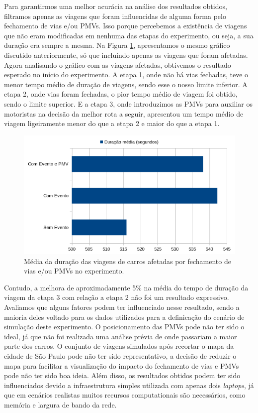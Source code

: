 Para garantirmos uma melhor acurácia na análise dos resultados obtidos, filtramos apenas as viagens que foram influencidas de alguma forma pelo fechamento de vias e/ou PMVs.
Isso porque percebemos a existência de viagens que não eram modificadas em nenhuma das etapas do experimento, ou seja, a sua duração era sempre a mesma.
Na Figura \ref{fig:duracao_filtered}, apresentamos o mesmo gráfico discutido anteriormente, só que incluindo apenas as viagens que foram afetadas.
Agora analisando o gráfico com as viagens afetadas, obtivemos o resultado esperado no início do experimento.
A etapa 1, onde não há vias fechadas, teve o menor tempo médio de duração de viagens, sendo esse o nosso limite inferior.
A etapa 2, onde vias foram fechadas, o pior tempo médio de viagem foi obtido, sendo o limite superior.
E a etapa 3, onde introduzimos as PMVs para auxiliar os motoristas na decisão da melhor rota a seguir, apresentou um tempo médio de viagem ligeiramente menor do que a etapa 2 e maior do que a etapa 1.

\begin{figure}[ht]
	\centering
	\includegraphics[width=\textwidth]{figuras/duracao_filtered.png}
	\caption{Média da duração das viagens de carros afetadas por fechamento de vias e/ou PMVs no experimento.}
	\label{fig:duracao_filtered}
\end{figure}

Contudo, a melhora de aproximadamente 5\% na média do tempo de duração da viagem da etapa 3 com relação a etapa 2 não foi um resultado expressivo.
Avaliamos que alguns fatores podem ter influenciado nesse resultado, sendo a maioria deles voltado para os dados utilizados para a definicação do cenário de simulação deste experimento.
O posicionamento das PMVs pode não ter sido o ideal, já que não foi realizada uma análise prévia de onde passariam a maior parte dos carros.
O conjunto de viagens simulados após recortar o mapa da cidade de São Paulo pode não ter sido representativo, a decisão de reduzir o mapa para facilitar a visualização do impacto do fechamento de vias
e PMVs pode não ter sido boa ideia.
Além disso, os resultados obtidos podem ter sido influenciados devido a infraestrutura simples utilizada com apenas dois \textit{laptops}, já que em cenários realistas muitos recursos computationais são
necessários, como memória e largura de bando da rede.


